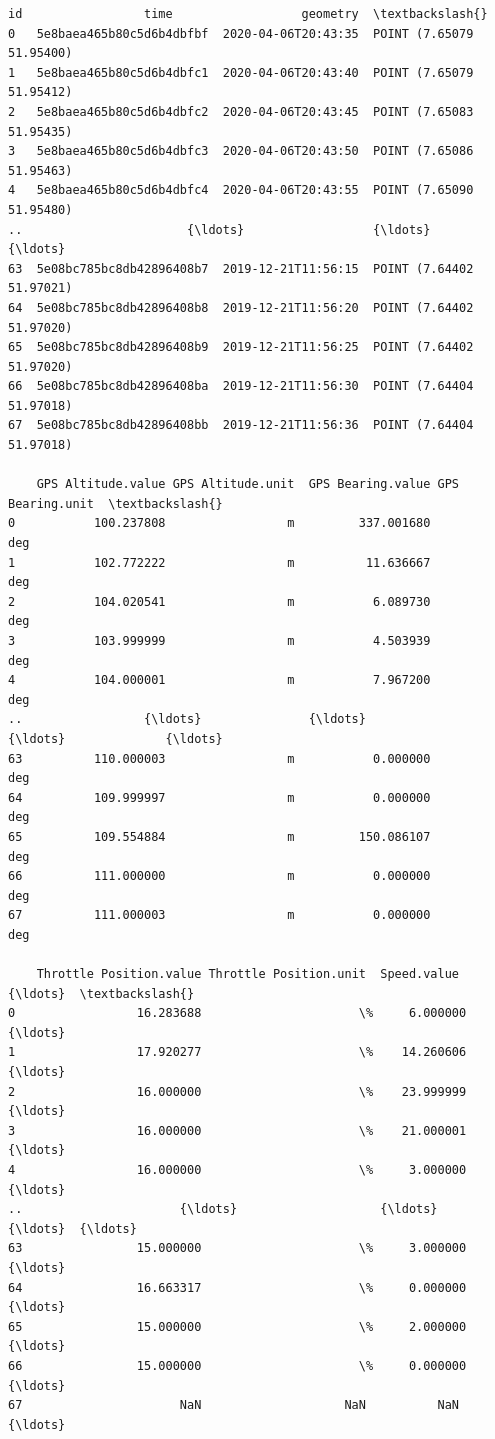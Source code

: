 \documentclass[11pt]{article}
\makeatletter
\newcommand{\boxspacing}{\kern\kvtcb@left@rule\kern\kvtcb@boxsep}
\newcommand{\prompt}[4]{
        \ttfamily\llap{{\color{#2}[#3]:\hspace{3pt}#4}}\vspace{-\baselineskip}
    }
\makeatother
\begin{document}
            \begin{tcolorbox}[breakable, size=fbox, boxrule=.5pt, pad at break*=1mm, opacityfill=0]
\prompt{Out}{outcolor}{6}{\boxspacing}
\begin{Verbatim}[commandchars=\\\{\}]
                          id                 time                  geometry  \textbackslash{}
0   5e8baea465b80c5d6b4dbfbf  2020-04-06T20:43:35  POINT (7.65079 51.95400)
1   5e8baea465b80c5d6b4dbfc1  2020-04-06T20:43:40  POINT (7.65079 51.95412)
2   5e8baea465b80c5d6b4dbfc2  2020-04-06T20:43:45  POINT (7.65083 51.95435)
3   5e8baea465b80c5d6b4dbfc3  2020-04-06T20:43:50  POINT (7.65086 51.95463)
4   5e8baea465b80c5d6b4dbfc4  2020-04-06T20:43:55  POINT (7.65090 51.95480)
..                       {\ldots}                  {\ldots}                       {\ldots}
63  5e08bc785bc8db42896408b7  2019-12-21T11:56:15  POINT (7.64402 51.97021)
64  5e08bc785bc8db42896408b8  2019-12-21T11:56:20  POINT (7.64402 51.97020)
65  5e08bc785bc8db42896408b9  2019-12-21T11:56:25  POINT (7.64402 51.97020)
66  5e08bc785bc8db42896408ba  2019-12-21T11:56:30  POINT (7.64404 51.97018)
67  5e08bc785bc8db42896408bb  2019-12-21T11:56:36  POINT (7.64404 51.97018)

    GPS Altitude.value GPS Altitude.unit  GPS Bearing.value GPS Bearing.unit  \textbackslash{}
0           100.237808                 m         337.001680              deg
1           102.772222                 m          11.636667              deg
2           104.020541                 m           6.089730              deg
3           103.999999                 m           4.503939              deg
4           104.000001                 m           7.967200              deg
..                 {\ldots}               {\ldots}                {\ldots}              {\ldots}
63          110.000003                 m           0.000000              deg
64          109.999997                 m           0.000000              deg
65          109.554884                 m         150.086107              deg
66          111.000000                 m           0.000000              deg
67          111.000003                 m           0.000000              deg

    Throttle Position.value Throttle Position.unit  Speed.value  {\ldots}  \textbackslash{}
0                 16.283688                      \%     6.000000  {\ldots}
1                 17.920277                      \%    14.260606  {\ldots}
2                 16.000000                      \%    23.999999  {\ldots}
3                 16.000000                      \%    21.000001  {\ldots}
4                 16.000000                      \%     3.000000  {\ldots}
..                      {\ldots}                    {\ldots}          {\ldots}  {\ldots}
63                15.000000                      \%     3.000000  {\ldots}
64                16.663317                      \%     0.000000  {\ldots}
65                15.000000                      \%     2.000000  {\ldots}
66                15.000000                      \%     0.000000  {\ldots}
67                      NaN                    NaN          NaN  {\ldots}


\end{Verbatim}
\end{tcolorbox}
\end{document}
